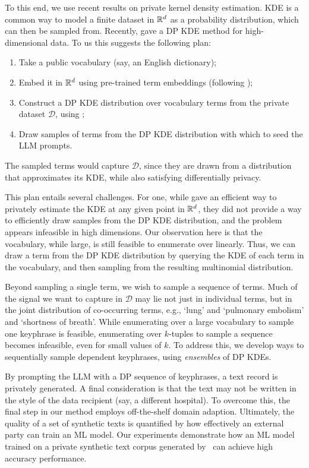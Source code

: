 To this end, we use recent results on private kernel density estimation. 
KDE is a common way to model a finite dataset in $\mathbb R^d$ as a probability distribution, which can then be sampled from. 
Recently, \cite{wagner2023fast} gave a DP KDE method for high-dimensional data. 
To us this suggests the following plan: 
\begin{enumerate}
    \item Take a public vocabulary (say, an English dictionary);
    \item Embed it in $\mathbb R^d$ using pre-trained term embeddings (following \cite{mikolov2013efficient});
    \item Construct a DP KDE distribution over vocabulary terms from the private dataset $\mathcal D$, using \cite{wagner2023fast};
    \item Draw samples of terms from the DP KDE distribution with which to seed the LLM prompts. 
\end{enumerate}   
The sampled terms would capture $\mathcal D$, since they are drawn from a distribution that approximates its KDE, while also satisfying differentially privacy.

This plan entails several challenges. 
For one, while \cite{wagner2023fast} gave an efficient way to privately estimate the KDE at any given point in $\mathbb R^d$, they did not provide a way to efficiently draw samples from the DP KDE distribution, and the problem appears infeasible in high dimensions. 
Our observation here is that the vocabulary, while large, is still feasible to enumerate over linearly. Thus, we can draw a term from the DP KDE distribution by querying the KDE of each term in the vocabulary, and then sampling from the resulting multinomial distribution. 


Beyond sampling a single term, we wish to sample a sequence of terms. Much of the signal we want to capture in $\mathcal D$ may lie not just in individual terms, but in the joint distribution of co-occurring terms, e.g., ‘lung’ and ‘pulmonary embolism’ and ‘shortness of breath’. While enumerating over a large vocabulary to sample one keyphrase is feasible, enumerating over $k$-tuples to sample a sequence becomes infeasible, even for small values of $k$. 
To address this, we develop ways to sequentially sample dependent keyphrases, using \emph{ensembles} of DP KDEs. 


By prompting the LLM with a DP sequence of keyphrases, a text record is privately generated.  A final consideration is that the text may not be written in the style of the data recipient (say, a different hospital).  
To overcome this, the final step in our method employs off-the-shelf domain adaption.
%
Ultimately, the quality of a set of synthetic texts is quantified by how effectively an external party can train an ML model.  Our experiments demonstrate how an ML model trained on a private synthetic text corpus generated by \alg\ can achieve high accuracy performance.


